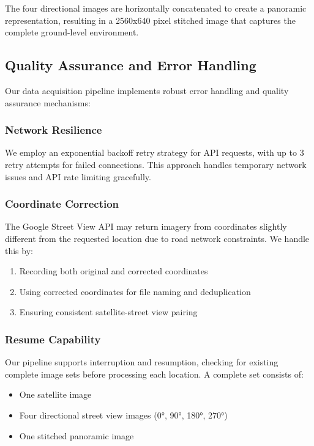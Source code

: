 The four directional images are horizontally concatenated to create a panoramic representation, resulting in a 2560x640 pixel stitched image that captures the complete ground-level environment.

\subsection{Quality Assurance and Error Handling}

Our data acquisition pipeline implements robust error handling and quality assurance mechanisms:

\subsubsection{Network Resilience}
We employ an exponential backoff retry strategy for API requests, with up to 3 retry attempts for failed connections. This approach handles temporary network issues and API rate limiting gracefully.

\subsubsection{Coordinate Correction}
The Google Street View API may return imagery from coordinates slightly different from the requested location due to road network constraints. We handle this by:
\begin{enumerate}
    \item Recording both original and corrected coordinates
    \item Using corrected coordinates for file naming and deduplication
    \item Ensuring consistent satellite-street view pairing
\end{enumerate}

\subsubsection{Resume Capability}
Our pipeline supports interruption and resumption, checking for existing complete image sets before processing each location. A complete set consists of:
\begin{itemize}
    \item One satellite image
    \item Four directional street view images (0°, 90°, 180°, 270°)
    \item One stitched panoramic image
\end{itemize}

